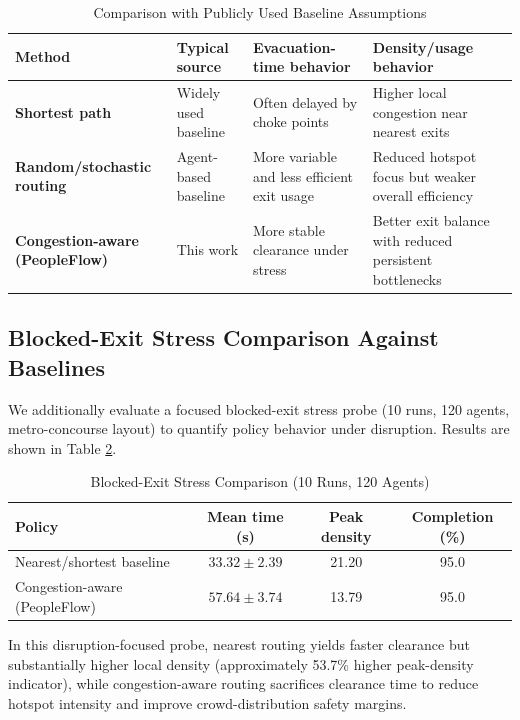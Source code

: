 \documentclass[journal]{IEEEtran}
\begin{document}
\begin{table}[t]
\centering
\caption{Comparison with Publicly Used Baseline Assumptions}
\label{tab:routing_assumptions}
{\footnotesize
\setlength{\tabcolsep}{3pt}
\begin{tabular}{>{\bfseries}p{1.7cm} p{1.5cm} p{1.7cm} p{1.2cm}}
\toprule
Method & Typical source & Evacuation-time behavior & Density/usage behavior \\
\midrule
Shortest path & Widely used baseline \cite{path_planning} & Often delayed by choke points & Higher local congestion near nearest exits \\
Random/stochastic routing & Agent-based baseline \cite{pan2007} & More variable and less efficient exit usage & Reduced hotspot focus but weaker overall efficiency \\
Congestion-aware (PeopleFlow) & This work & More stable clearance under stress & Better exit balance with reduced persistent bottlenecks \\
\bottomrule
\end{tabular}
}
\end{table}

\subsection{Blocked-Exit Stress Comparison Against Baselines}
We additionally evaluate a focused blocked-exit stress probe (10 runs, 120 agents, metro-concourse layout) to quantify policy behavior under disruption. Results are shown in Table \ref{tab:blocked_policy_comparison}.

\begin{table}[t]
\centering
\caption{Blocked-Exit Stress Comparison (10 Runs, 120 Agents)}
\label{tab:blocked_policy_comparison}
{\footnotesize
\setlength{\tabcolsep}{3pt}
\begin{tabular}{>{\raggedright\arraybackslash}p{2.2cm}ccc}
\toprule
\textbf{Policy} & \textbf{Mean time (s)} & \textbf{Peak density} & \textbf{Completion (\%)} \\
\midrule
Nearest/shortest baseline & $33.32 \pm 2.39$ & 21.20 & 95.0 \\
Congestion-aware (PeopleFlow) & $57.64 \pm 3.74$ & 13.79 & 95.0 \\
\bottomrule
\end{tabular}
}
\end{table}

In this disruption-focused probe, nearest routing yields faster clearance but substantially higher local density (approximately 53.7\% higher peak-density indicator), while congestion-aware routing sacrifices clearance time to reduce hotspot intensity and improve crowd-distribution safety margins.
\end{document}
